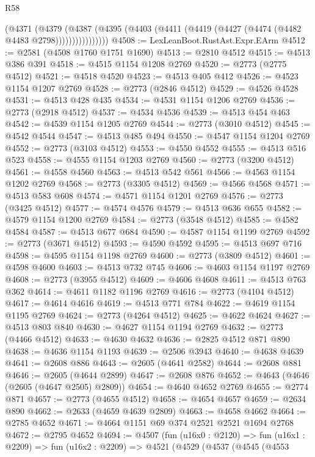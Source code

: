 \begin{lexlean}{R58}
\begin{coremodule}
                (@4371
                  (@4379
                    (@4387
                      (@4395 (@4403 (@4411 (@4419 (@4427 (@4474 (@4482 @4483 @2798))))))))))))))))
@4508 := LexLeanBoot.RustAst.Expr.EArm
@4512 := @2581 (@4508 @1760 @1751 @1690)
@4513 := @2810 @4512
@4515 := @4513 @386 @391
@4518 := @4515 @1154 @1208 @2769
@4520 := @2773 (@2775 @4512)
@4521 := @4518 @4520
@4523 := @4513 @405 @412
@4526 := @4523 @1154 @1207 @2769
@4528 := @2773 (@2846 @4512)
@4529 := @4526 @4528
@4531 := @4513 @428 @435
@4534 := @4531 @1154 @1206 @2769
@4536 := @2773 (@2918 @4512)
@4537 := @4534 @4536
@4539 := @4513 @454 @463
@4542 := @4539 @1154 @1205 @2769
@4544 := @2773 (@3010 @4512)
@4545 := @4542 @4544
@4547 := @4513 @485 @494
@4550 := @4547 @1154 @1204 @2769
@4552 := @2773 (@3103 @4512)
@4553 := @4550 @4552
@4555 := @4513 @516 @523
@4558 := @4555 @1154 @1203 @2769
@4560 := @2773 (@3200 @4512)
@4561 := @4558 @4560
@4563 := @4513 @542 @561
@4566 := @4563 @1154 @1202 @2769
@4568 := @2773 (@3305 @4512)
@4569 := @4566 @4568
@4571 := @4513 @583 @608
@4574 := @4571 @1154 @1201 @2769
@4576 := @2773 (@3425 @4512)
@4577 := @4574 @4576
@4579 := @4513 @636 @655
@4582 := @4579 @1154 @1200 @2769
@4584 := @2773 (@3548 @4512)
@4585 := @4582 @4584
@4587 := @4513 @677 @684
@4590 := @4587 @1154 @1199 @2769
@4592 := @2773 (@3671 @4512)
@4593 := @4590 @4592
@4595 := @4513 @697 @716
@4598 := @4595 @1154 @1198 @2769
@4600 := @2773 (@3809 @4512)
@4601 := @4598 @4600
@4603 := @4513 @732 @745
@4606 := @4603 @1154 @1197 @2769
@4608 := @2773 (@3955 @4512)
@4609 := @4606 @4608
@4611 := @4513 @763 @362
@4614 := @4611 @1182 @1196 @2769
@4616 := @2773 (@4104 @4512)
@4617 := @4614 @4616
@4619 := @4513 @771 @784
@4622 := @4619 @1154 @1195 @2769
@4624 := @2773 (@4264 @4512)
@4625 := @4622 @4624
@4627 := @4513 @803 @840
@4630 := @4627 @1154 @1194 @2769
@4632 := @2773 (@4466 @4512)
@4633 := @4630 @4632
@4636 := @2825 @4512 @871 @890
@4638 := @4636 @1154 @1193
@4639 := @2506 @3943
@4640 := @4638 @4639
@4641 := @2608 @886
@4643 := @2605 (@4641 @2582)
@4644 := @2608 @881
@4646 := @2605 (@4644 @2899)
@4647 := @2608 @876
@4652 := @4643 (@4646 (@2605 (@4647 @2505) @2809))
@4654 := @4640 @4652 @2769
@4655 := @2774 @871
@4657 := @2773 (@4655 @4512)
@4658 := @4654 @4657
@4659 := @2634 @890
@4662 := @2633 (@4659 @4639 @2809)
@4663 := @4658 @4662
@4664 := @2785 @4652
@4671 := @4664 @1151 @69 @374 @2521 @2521 @1694 @2768
@4672 := @2795 @4652
@4694 := @4507
    (fun (u16x0 : @2120) =>
    fun (u16x1 : @2209) =>
    fun (u16x2 : @2209) =>
    @4521
      (@4529
        (@4537
          (@4545
            (@4553

\end{coremodule}
\end{lexlean}
